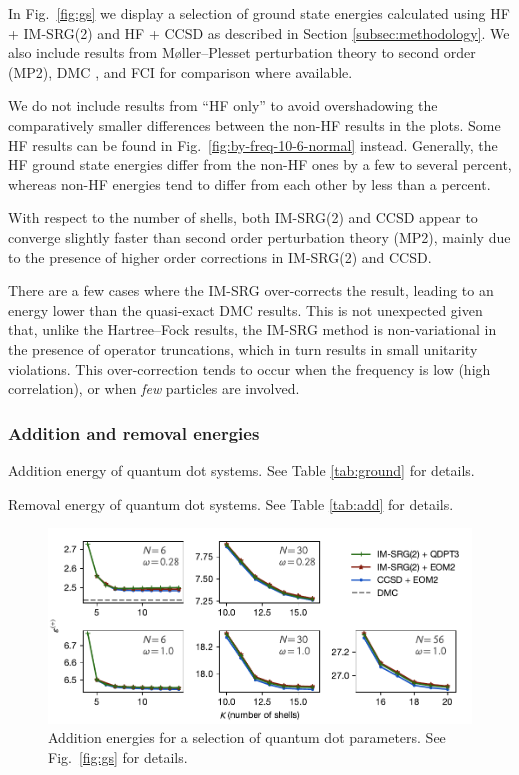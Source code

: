 In Fig.~\ref{fig:gs} we display a selection of ground state energies
calculated using HF + IM-SRG(2) and HF + CCSD as described in
Section \ref{subsec:methodology}.  We also include results from M\o ller--Plesset perturbation theory to second order (MP2),
DMC \cite{hoegberget2013thesis}, and FCI \cite{olsen2013thesis} for
comparison where available.

We do not include results from ``HF only'' to avoid overshadowing the
comparatively smaller differences between the non-HF results in the
plots.  Some HF results can be found in 
Fig.~\ref{fig:by-freq-10-6-normal} instead.  Generally, the HF ground
state energies differ from the non-HF ones by a few to several
percent, whereas non-HF energies tend to differ from each other by
less than a percent.

With respect to the number of shells, both IM-SRG(2) and CCSD appear
to converge slightly faster than second order perturbation theory
(MP2), mainly due to the presence of higher order corrections in
IM-SRG(2) and CCSD.

There are a few cases where the IM-SRG over-corrects the result,
leading to an energy lower than the quasi-exact DMC results.  This is
not unexpected given that, unlike the Hartree--Fock results, the IM-SRG method is
non-variational in the presence of operator truncations, which in turn results in 
small unitarity violations.  This over-correction tends to occur when
the frequency is low (high correlation), or when \emph{few} particles are involved.

\subsubsection{Addition and removal energies}

\begin{table}
  \centering
  \caption{Addition energy of quantum dot systems.  See Table \ref{tab:ground} for details.}
  \label{tab:add}
  
\end{table}

\begin{table}
  \centering
  \caption{Removal energy of quantum dot systems.  See Table \ref{tab:add} for details.}
  \label{tab:rm}
  
\end{table}

\begin{figure}
  \centering
  \includegraphics{fig-add2.pdf}
  \caption{Addition energies for a selection of quantum dot parameters.  See Fig.~\ref{fig:gs} for details.}
  \label{fig:add}
\end{figure}


